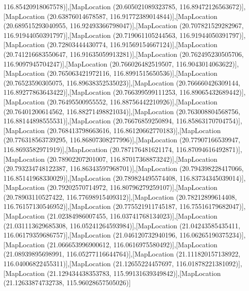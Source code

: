 116.85420918067578)],[MapLocation (20.605021089323785, 116.89472126563672)],[MapLocation (20.63876014678587, 116.91772389014844)],[MapLocation (20.689515293040955, 116.92493366798047)],[MapLocation (20.707821529282967, 116.91944050391797)],[MapLocation (20.719061105244563, 116.91944050391797)],[MapLocation (20.72803444430774, 116.91569154667124)],[MapLocation (20.741216683550647, 116.91635059913281)],[MapLocation (20.762495230505706, 116.9097945704247)],[MapLocation (20.766026482519507, 116.9043014063622)],[MapLocation (20.765063421972116, 116.8991515650536)],[MapLocation (20.76523590305075, 116.89638352535023)],[MapLocation (20.766660426309144, 116.89277863643422)],[MapLocation (20.766399599111253, 116.89065432689442)],[MapLocation (20.76495500955552, 116.88756442210926)],[MapLocation (20.76401200614562, 116.88271498821034)],[MapLocation (20.763008804568756, 116.88144898555531)],[MapLocation (20.76676859250894, 116.85863170704754)],[MapLocation (20.768413798663616, 116.86120662770183)],[MapLocation (20.776318563739295, 116.86807308277996)],[MapLocation (20.77907166539947, 116.8693582971919)],[MapLocation (20.787176481621174, 116.87094616492871)],[MapLocation (20.78902207201007, 116.87017368873242)],[MapLocation (20.793234748122387, 116.86343597968701)],[MapLocation (20.794398228417066, 116.85141968330029)],[MapLocation (20.789824495574408, 116.83734345039014)],[MapLocation (20.79202570714972, 116.80796279259107)],[MapLocation (20.78903110527422, 116.77698915409312)],[MapLocation (20.78212899614408, 116.76157130546952)],[MapLocation (20.775521911745187, 116.75516179682047)],[MapLocation (21.02384986007455, 116.03741768134023)],[MapLocation (21.031113629685308, 116.05241264593984)],[MapLocation (21.04243585435411, 116.06179359686757)],[MapLocation (21.046120732940196, 116.06265190375234)],[MapLocation (21.066653996900612, 116.0616975580492)],[MapLocation (21.08939895698991, 116.05277116644764)],[MapLocation (21.111820157138922, 116.04006822455311)],[MapLocation (21.12655224457697, 116.01878221381092)],[MapLocation (21.129434438353783, 115.99131639349842)],[MapLocation (21.12633874732738, 115.96028657505026)]